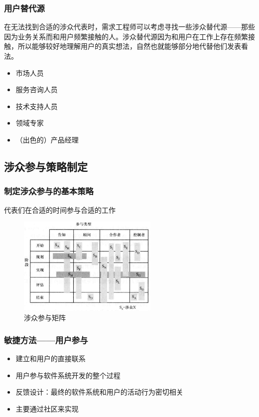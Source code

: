 \subsubsection{用户替代源}
在无法找到合适的涉众代表时，需求工程师可以考虑寻找一些涉众替代源——那些因为业务关系而和用户频繁接触的人。涉众替代源因为和用户在工作上存在频繁接触，所以能够较好地理解用户的真实想法，自然也就能够部分地代替他们发表看法。
\vspace{-0.8em}
\begin{multicols}{3}
    \begin{itemize}
        \item 市场人员
        \item 服务咨询人员
        \item 技术支持人员
        \item 领域专家
        \item （出色的）产品经理
    \end{itemize}
\end{multicols}
\vspace{-1em}

\subsection{涉众参与策略制定}

\subsubsection{制定涉众参与的基本策略}
代表们在合适的时间参与合适的工作
\begin{figure}[H]
    \vspace{-0.5em}
	\centering
	\includegraphics[width=0.6\textwidth]{img/涉众参与矩阵.png}
    \caption*{涉众参与矩阵}
    \vspace{-1em}
\end{figure}

\subsubsection{敏捷方法——用户参与}
\begin{itemize}
    \item 建立和用户的直接联系 
    \item 用户参与软件系统开发的整个过程 
    \item 反馈设计：最终的软件系统和用户的活动行为密切相关
    \item 主要通过社区来实现
\end{itemize}

